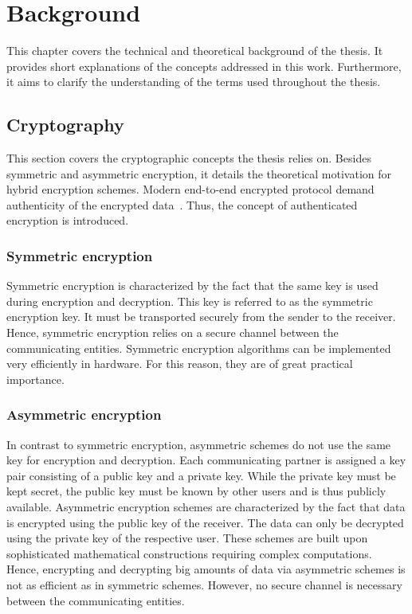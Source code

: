 \documentclass[../main.tex]{subfiles}
\begin{document}
\chapter{Background}
\label{chap:background}

This chapter covers the technical and theoretical background of the thesis.
It provides short explanations of the concepts addressed in this work.
Furthermore, it aims to clarify the understanding of the terms used throughout the thesis.

\section{Cryptography}
This section covers the cryptographic concepts the thesis relies on.
Besides symmetric and asymmetric encryption, it details the theoretical motivation for hybrid encryption schemes.
Modern end-to-end encrypted protocol demand authenticity of the encrypted data~\cite{Mallory2022}.
Thus, the concept of authenticated encryption is introduced.

\subsection{Symmetric encryption}
Symmetric encryption is characterized by the fact that the same key is used during encryption and decryption.
This key is referred to as the symmetric encryption key.
It must be transported securely from the sender to the receiver.
Hence, symmetric encryption relies on a secure channel between the communicating entities.
Symmetric encryption algorithms can be implemented very efficiently in hardware.
For this reason, they are of great practical importance.~\cite[300]{Eckert2018}

\subsection{Asymmetric encryption}
In contrast to symmetric encryption, asymmetric schemes do not use the same key for encryption and decryption.
Each communicating partner is assigned a key pair consisting of a public key and a private key.
While the private key must be kept secret, the public key must be known by other users and is thus publicly available.
Asymmetric encryption schemes are characterized by the fact that data is encrypted using the public key of the receiver.
The data can only be decrypted using the private key of the respective user.
These schemes are built upon sophisticated mathematical constructions requiring complex computations.
Hence, encrypting and decrypting big amounts of data via asymmetric schemes is not as efficient as in symmetric schemes.
However, no secure channel is necessary between the communicating entities.~\cite[331]{Eckert2018}
\end{document}
